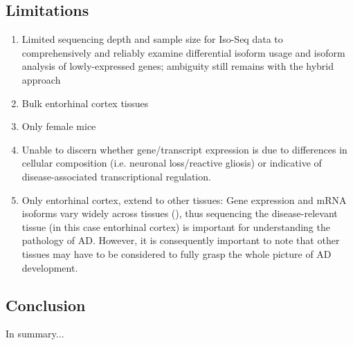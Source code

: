 \subsection{Limitations}
\begin{enumerate}
	\item Limited sequencing depth and sample size for Iso-Seq data to comprehensively and reliably examine differential isoform usage and isoform analysis of lowly-expressed genes; ambiguity still remains with the hybrid approach
	\item Bulk entorhinal cortex tissues
	\item Only female mice
	\item Unable to discern whether gene/transcript expression is due to differences in cellular composition (i.e. neuronal loss/reactive gliosis) or indicative of disease-associated transcriptional regulation.
	\item Only entorhinal cortex, extend to other tissues: Gene expression and mRNA isoforms vary widely across tissues (\cite{Wang2008}), thus sequencing the disease-relevant tissue (in this case entorhinal cortex) is important for understanding the pathology of AD. However, it is consequently important to note that other tissues may have to be considered to fully grasp the whole picture of AD development. 
\end{enumerate}

\subsection{Conclusion}
In summary...
